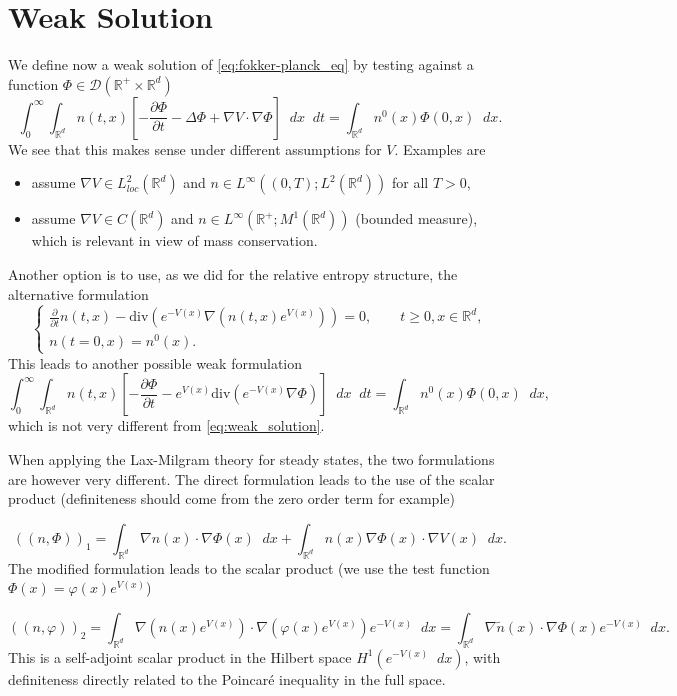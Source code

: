 \documentclass{article}
\newcommand{\R}{\mathbb{R}}
\renewcommand{\phi}{\varphi}
\newcommand{\diff}{\mathop{}\!d}
\newcommand{\pd}[2]{\frac{\partial #1}{\partial #2}}
\renewcommand{\div}{\mathrm{div}}
\theoremstyle{definition}
\theoremstyle{plain}
\theoremstyle{remark}
\begin{document}
\section{Weak Solution}
We define now a weak solution of \eqref{eq:fokker-planck_eq} by testing against a function $ \Phi\in\mathcal{D}(\R^+\times\R^d) $
\begin{equation}
\int_{0}^{\infty}\int_{\R^d}n(t,x)\left[-\pd{\Phi}{t}-\Delta\Phi+\nabla V\cdot\nabla\Phi \right]\diff x\diff t=\int_{\R^d}n^0(x)\Phi(0,x)\diff x.
\label{eq:weak_solution}
\end{equation}
We see that this makes sense under different assumptions for $ V $. Examples are
\begin{itemize}
	\item assume $ \nabla V\in L_{loc}^2(\R^d) $ and $ n\in L^{\infty}\left((0,T);L^2(\R^d)\right) $ for all $ T>0 $,
	\item assume $ \nabla V\in C(\R^d) $ and $ n\in L^{\infty}\left(\R^+;M^1(\R^d)\right) $ (bounded measure), which is relevant in view of mass conservation.
\end{itemize}
Another option is to use, as we did for the relative entropy structure, the alternative formulation
\begin{equation}
\begin{cases}
\pd{}{t}n(t,x)-\div\left(e^{-V(x)}\nabla(n(t,x)e^{V(x)})\right)=0, \qquad t\geq 0, x\in\R^d,\\
n(t=0,x)=n^0(x).
\end{cases}
\end{equation}
This leads to another possible weak formulation
\[\int_{0}^{\infty}\int_{\R^d}n(t,x)\left[-\pd{\Phi}{t}-e^{V(x)}\div\left(e^{-V(x)}\nabla\Phi \right) \right]\diff x\diff t=\int_{\R^d}n^0(x)\Phi(0,x)\diff x, \]
which is not very different from \eqref{eq:weak_solution}.

When applying the Lax-Milgram theory \cite{salsa2016equazioni} for steady states, the two formulations are however very different. The direct formulation leads to the use of the scalar product (definiteness should come from the zero order term for example)

\[((n,\Phi))_1=\int_{\R^d}\nabla n(x)\cdot \nabla\Phi(x)\diff x+\int_{\R^d}n(x)\nabla\Phi(x)\cdot\nabla V(x)\diff x. \]
The modified formulation leads to the scalar product (we use the test function $ \Phi(x)=\phi(x)e^{V(x)} $)

\[((n,\phi))_2=\int_{\R^d}\nabla(n(x)e^{V(x)})\cdot\nabla(\phi(x)e^{V(x)})e^{-V(x)}\diff x= \int_{\R^d}\nabla\tilde{n}(x)\cdot\nabla\Phi(x)e^{-V(x)}\diff x. \]
This is a self-adjoint scalar product in the Hilbert space $ H^1(e^{-V(x)}\diff x) $, with definiteness directly related to the Poincaré inequality in the full space.
\end{document}
